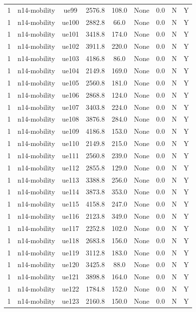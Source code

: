 \begin{table}[ht]
\begin{tabular}{|c|c|c|c|c|c|c|c|c|}
1 & n14-mobility & ue99 & 2576.8 & 108.0 & None & 0.0 & N & Y \\
1 & n14-mobility & ue100 & 2882.8 & 66.0 & None & 0.0 & N & Y \\
1 & n14-mobility & ue101 & 3418.8 & 174.0 & None & 0.0 & N & Y \\
1 & n14-mobility & ue102 & 3911.8 & 220.0 & None & 0.0 & N & Y \\
1 & n14-mobility & ue103 & 4186.8 & 86.0 & None & 0.0 & N & Y \\
1 & n14-mobility & ue104 & 2149.8 & 169.0 & None & 0.0 & N & Y \\
1 & n14-mobility & ue105 & 2560.8 & 181.0 & None & 0.0 & N & Y \\
1 & n14-mobility & ue106 & 2868.8 & 124.0 & None & 0.0 & N & Y \\
1 & n14-mobility & ue107 & 3403.8 & 224.0 & None & 0.0 & N & Y \\
1 & n14-mobility & ue108 & 3876.8 & 284.0 & None & 0.0 & N & Y \\
1 & n14-mobility & ue109 & 4186.8 & 153.0 & None & 0.0 & N & Y \\
1 & n14-mobility & ue110 & 2149.8 & 215.0 & None & 0.0 & N & Y \\
1 & n14-mobility & ue111 & 2560.8 & 239.0 & None & 0.0 & N & Y \\
1 & n14-mobility & ue112 & 2855.8 & 129.0 & None & 0.0 & N & Y \\
1 & n14-mobility & ue113 & 3388.8 & 256.0 & None & 0.0 & N & Y \\
1 & n14-mobility & ue114 & 3873.8 & 353.0 & None & 0.0 & N & Y \\
1 & n14-mobility & ue115 & 4158.8 & 247.0 & None & 0.0 & N & Y \\
1 & n14-mobility & ue116 & 2123.8 & 349.0 & None & 0.0 & N & Y \\
1 & n14-mobility & ue117 & 2252.8 & 102.0 & None & 0.0 & N & Y \\
1 & n14-mobility & ue118 & 2683.8 & 156.0 & None & 0.0 & N & Y \\
1 & n14-mobility & ue119 & 3112.8 & 183.0 & None & 0.0 & N & Y \\
1 & n14-mobility & ue120 & 3425.8 & 88.0 & None & 0.0 & N & Y \\
1 & n14-mobility & ue121 & 3898.8 & 164.0 & None & 0.0 & N & Y \\
1 & n14-mobility & ue122 & 1784.8 & 152.0 & None & 0.0 & N & Y \\
1 & n14-mobility & ue123 & 2160.8 & 150.0 & None & 0.0 & N & Y \\

\end{tabular}
\end{table}

